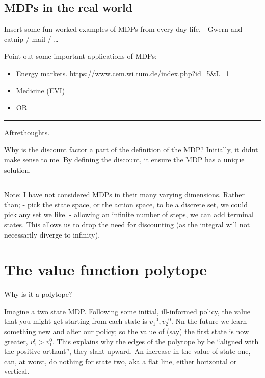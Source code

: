 \hypertarget{mdps-in-the-real-world}{%
\subsection{MDPs in the real world}\label{mdps-in-the-real-world}}

Insert some fun worked examples of MDPs from every day life. - Gwern and
catnip / mail / \ldots{}

Point out some important applications of MDPs;

\begin{itemize}
\tightlist
\item
  Energy markets. https://www.cem.wi.tum.de/index.php?id=5\&L=1
\item
  Medicine (EVI)
\item
  OR
\end{itemize}

\begin{center}\rule{0.5\linewidth}{\linethickness}\end{center}

Aftrethoughts.

Why is the discount factor a part of the definition of the MDP?
Initially, it didnt make sense to me. By defining the discount, it
ensure the MDP has a unique solution.

\begin{center}\rule{0.5\linewidth}{\linethickness}\end{center}

Note: I have not considered MDPs in their many varying dimensions.
Rather than; - pick the state space, or the action space, to be a
discrete set, we could pick any set we like. - allowing an infinite
number of steps, we can add terminal states. This allows us to drop the
need for discounting (as the integral will not necessarily diverge to
infinity).


\section{The value function polytope}

Why is it a polytope?

Imagine a two state MDP. Following some initial, ill-informed policy,
the value that you might get starting from each state is
${v_1}^0, {v_2}^0$. Nn the future we learn something new and alter our
policy; so the value of (say) the first state is now greater,
\(v_1^t > v_1^0\). This explains why the edges of the polytope by be
``aligned with the positive orthant'', they slant upward. An increase in
the value of state one, can, at worst, do nothing for state two, aka a
flat line, either horizontal or vertical.

